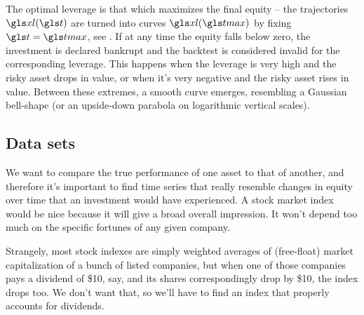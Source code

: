The optimal leverage is that which maximizes the final equity -- the trajectories $\xl(\t)$ are turned into curves $\xl(\tmax)$ by fixing $\t=\tmax$, see . 
If at any time the equity falls below zero, the investment is declared bankrupt and the backtest is considered invalid for the corresponding leverage. This happens when the leverage is very high and the risky asset drops in value, or when it's very negative and the risky asset rises in value. Between these extremes, a smooth curve emerges, resembling a Gaussian bell-shape (or an upside-down parabola on logarithmic vertical scales).

\FloatBarrier 
\subsection{Data sets}
We want to compare the true performance of one asset to that of another, and therefore it's important to find time series that really resemble changes in equity over time that an investment would have experienced. A stock market index would be nice because it will give a broad overall impression. It won't depend too much on the specific fortunes of any given company.

Strangely, most stock indexes are simply weighted averages of (free-float) market capitalization of a bunch of listed companies, but when one of those companies pays a dividend of \$10, say, and its shares correspondingly drop by \$10, the index drops too. We don't want that, so we'll have to find an index that properly accounts for dividends. 

